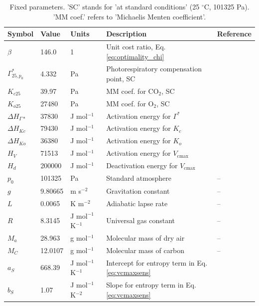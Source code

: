 \documentclass{myreport}
\newcommand{\vcmax}{$V_{\text{cmax}}$}
\begin{document}
\begin{table}
\centering
\begin{tabular}{lllll}
  \toprule
    Symbol     & Value   & Units         & Description           &  Reference   \\
  \midrule
    $\beta$      & 146.0     & 1             & Unit cost ratio, Eq. \ref{eq:optimality_chi} & \citet{Wang2017-ls} \\
  $\Gamma^\ast_{25, p_0}$ & 4.332 & Pa & Photorespiratory compensation point, SC & \citet{bernacchi01} \\
  $K_{c25}$    & 39.97   & Pa            & MM coef. for CO$_2$, SC&  \citet{bernacchi01} \\
  $K_{o25}$    & 27480   & Pa            & MM coef. for O$_2$, SC&  \citet{bernacchi01} \\
  $\Delta H_{\Gamma\ast}$ & 37830 & J mol$^{-1}$ & Activation energy for $\Gamma^\ast$  & \citet{bernacchi01} \\
  $\Delta H_{Kc}$ & 79430  & J mol$^{-1}$  & Activation energy for $K_c$&  \citet{bernacchi01} \\
  $\Delta H_{Ko}$ & 36380  & J mol$^{-1}$  & Activation energy for $K_o$&  \citet{bernacchi01} \\
  $H_V$        & 71513   & J mol$^{-1}$  & Activation energy for \vcmax\ & \citet{kattge07} \\
  $H_d$        & 200000   & J mol$^{-1}$  & Deactivation energy for \vcmax\ & \citet{kattge07} \\
  $p_0$        & 101325  & Pa            & Standard atmosphere   & -- \\
  $g$          & 9.80665 & m s$^{-2}$    & Gravitation constant  & -- \\
  $L$          & 0.0065  & K m$^{-2}$    & Adiabatic lapse rate  & -- \\
  $R$          & 8.3145  & J mol$^{-1}$ K$^{-1}$ & Universal gas constant & -- \\
  $M_a$        & 28.963  & g mol$^{-1}$  & Molecular mass of dry air & -- \\
    $M_C$        & 12.0107 & g mol$^{-1} $ & Molecular mass of carbon & -- \\ 
  $a_S$        & 668.39  & J mol$^{-1}$ K$^{-1}$ & Intercept for entropy term in Eq. \ref{eq:vcmaxsens} & \citet{kattge07} \\
  $b_S$        & 1.07  & J mol$^{-1}$ K$^{-2}$ & Slope for entropy term in Eq. \ref{eq:vcmaxsens} & \citet{kattge07} \\
  \bottomrule
\end{tabular}
\caption{Fixed parameters. 'SC' stands for 'at standard conditions' (25 $^{\circ}$C, 101325 Pa). 'MM coef.' refers to 'Michaelis Menten coefficient'.}
\label{tab:params}
\end{table}
\end{document}

